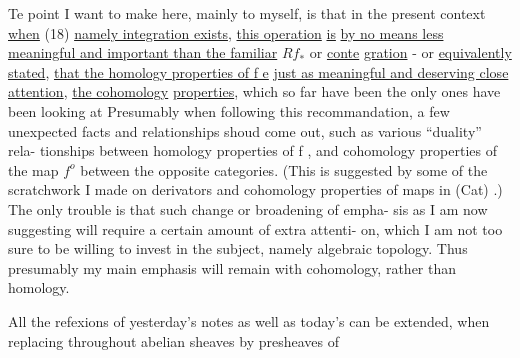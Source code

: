 Te point I want to make here, mainly to myself, is that in the
present context \uline{when} (18) \uline{namely integration exists}, \uline{this operation}  \uline{is}
\uline{by no means less meaningful and important than the familiar} $Rf_{*}$ or \uline{conte}%
\uline{gration} - or \uline{equivalently stated}, \uline{that the homology properties of f e}
\uline{just as meaningful and deserving close attention},   \uline{the cohomology}
\uline{properties}, which so far have been the only ones  have been looking at
Presumably when following this recommandation, a few unexpected 
facts and relationships shoud come out, such as various ``duality'' rela-%
tionships between homology properties of f , and cohomology properties
of the map $f^{o}$ between the opposite categories. (This is suggested by some
of the scratchwork I made on derivators and cohomology properties of maps
in (Cat) .) The only trouble is that such change or broadening of empha-%
sis as I am now suggesting will require a certain amount of extra attenti-%
on, which I am not too sure to be willing to invest in the subject,
namely algebraic topology. Thus presumably my main emphasis will remain
 with cohomology, rather than homology. 

\hand{)} All the refexions of yesterday's notes as well as today's can
be extended, when replacing throughout abelian sheaves by presheaves of



